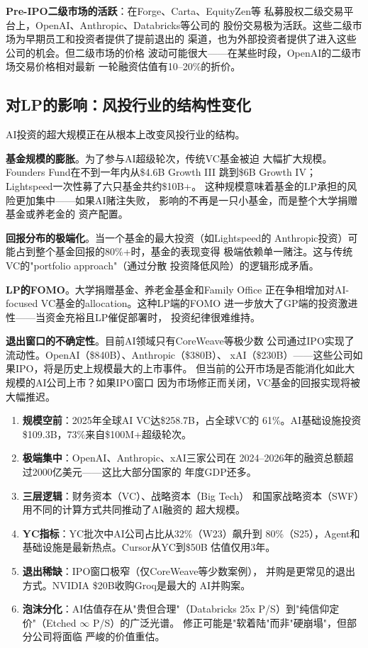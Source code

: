 \textbf{Pre-IPO二级市场的活跃}：在Forge、Carta、EquityZen等
私募股权二级交易平台上，OpenAI、Anthropic、Databricks等公司的
股份交易极为活跃。这些二级市场为早期员工和投资者提供了提前退出的
渠道，也为外部投资者提供了进入这些公司的机会。但二级市场的价格
波动可能很大——在某些时段，OpenAI的二级市场交易价格相对最新
一轮融资估值有10--20\%的折价。

\subsection{对LP的影响：风投行业的结构性变化}
\label{subsec:fund-lp-impact}

AI投资的超大规模正在从根本上改变风投行业的结构。

\textbf{基金规模的膨胀}。为了参与AI超级轮次，传统VC基金被迫
大幅扩大规模。Founders Fund在不到一年内从\$4.6B Growth III
跳到\$6B Growth IV；Lightspeed一次性募了六只基金共约\$10B+。
这种规模意味着基金的LP承担的风险更加集中——如果AI赌注失败，
影响的不再是一只小基金，而是整个大学捐赠基金或养老金的
资产配置。

\textbf{回报分布的极端化}。当一个基金的最大投资（如Lightspeed的
Anthropic投资）可能占到整个基金回报的80\%+时，基金的表现变得
极端依赖单一赌注。这与传统VC的"portfolio approach"（通过分散
投资降低风险）的逻辑形成矛盾。

\textbf{LP的FOMO}。大学捐赠基金、养老金基金和Family Office
正在争相增加对AI-focused VC基金的allocation。这种LP端的FOMO
进一步放大了GP端的投资激进性——当资金充裕且LP催促部署时，
投资纪律很难维持。

\textbf{退出窗口的不确定性}。目前AI领域只有CoreWeave等极少数
公司通过IPO实现了流动性。OpenAI（\$840B）、Anthropic（\$380B）、
xAI（\$230B）——这些公司如果IPO，将是历史上规模最大的上市事件。
但当前的公开市场是否能消化如此大规模的AI公司上市？如果IPO窗口
因为市场修正而关闭，VC基金的回报实现将被大幅推迟。

\bigskip

\begin{corebox}[本章核心要点总结]
\begin{enumerate}
  \item \textbf{规模空前}：2025年全球AI VC达\$258.7B，占全球VC的
    61\%。AI基础设施投资\$109.3B，73\%来自\$100M+超级轮次。
  \item \textbf{极端集中}：OpenAI、Anthropic、xAI三家公司在
    2024--2026年的融资总额超过2000亿美元——这比大部分国家的
    年度GDP还多。
  \item \textbf{三层逻辑}：财务资本（VC）、战略资本（Big Tech）
    和国家战略资本（SWF）用不同的计算方式共同推动了AI融资的
    超大规模。
  \item \textbf{YC指标}：YC批次中AI公司占比从32\%（W23）飙升到
    80\%（S25），Agent和基础设施是最新热点。Cursor从YC到\$50B
    估值仅用3年。
  \item \textbf{退出稀缺}：IPO窗口极窄（仅CoreWeave等少数案例），
    并购是更常见的退出方式。NVIDIA \$20B收购Groq是最大的
    AI并购案。
  \item \textbf{泡沫分化}：AI估值存在从"贵但合理"（Databricks
    25x P/S）到"纯信仰定价"（Etched $\infty$ P/S）的广泛光谱。
    修正可能是"软着陆"而非"硬崩塌"，但部分公司将面临
    严峻的价值重估。
\end{enumerate}
\end{corebox}

